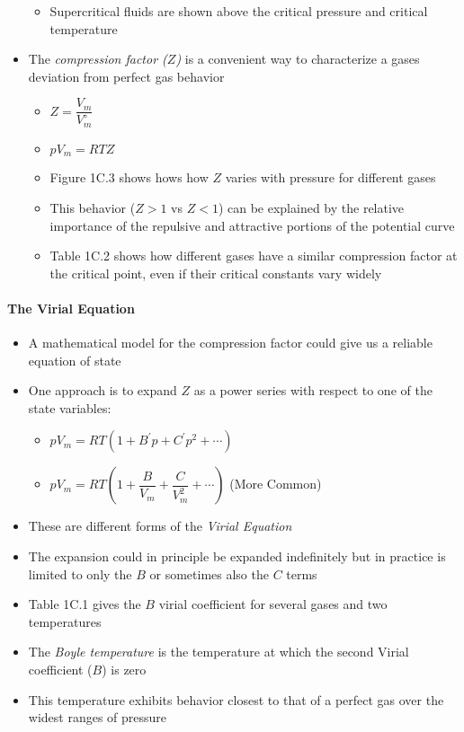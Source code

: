 \documentclass[12pt, openany, letterpaper]{memoir}
\begin{document}
\begin{itemize}
\begin{itemize}
	 	\item Supercritical fluids are shown above the critical pressure and critical temperature
 	\end{itemize}
 	\item The \emph{compression factor ($Z$)} is a convenient way to characterize a gases deviation from perfect gas behavior
 	\begin{itemize}
	 	\item $Z=\dfrac{V_m}{V_m^\circ}$	 	
	 	\item $pV_m = RTZ$
	 	\item Figure 1C.3 shows hows how $Z$ varies with pressure for different gases
	 	\item This behavior ($Z>1$ vs $Z<1$) can be explained by the relative importance of the repulsive and attractive portions of the potential curve
	 	\item Table 1C.2 shows how different gases have a similar compression factor at the critical point, even if their critical constants vary widely
 	\end{itemize}
\end{itemize}
\paragraph{The Virial Equation}
\begin{itemize}
	\item A mathematical model for the compression factor could give us a reliable equation of state
	\item One approach is to expand $Z$ as a power series with respect to one of the state variables:
	\begin{itemize}
		\item $pV_m = RT\left(1+B^\prime p + C^\prime p^2 + \cdots\right)$
		\item $pV_m = RT\left(1+\dfrac{B}{V_m} + \dfrac{C}{V_m^2}+\cdots\right)$ (More Common)
	\end{itemize}
	\item These are different forms of the \emph{Virial Equation}
	\item The expansion could in principle be expanded indefinitely but in practice is limited to only the $B$ or sometimes also the $C$ terms
	\item Table 1C.1 gives the $B$ virial coefficient for several gases and two temperatures
	\item The \emph{Boyle temperature} is the temperature at which the second Virial coefficient ($B$) is zero
	\item This temperature exhibits behavior closest to that of a perfect gas over the widest ranges of pressure	
\end{itemize}
\end{document}
